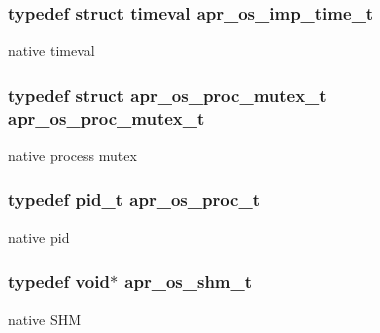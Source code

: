 \subsubsection[{\texorpdfstring{apr\+\_\+os\+\_\+imp\+\_\+time\+\_\+t}{apr_os_imp_time_t}}]{\setlength{\rightskip}{0pt plus 5cm}typedef struct timeval {\bf apr\+\_\+os\+\_\+imp\+\_\+time\+\_\+t}}\hypertarget{group__apr__portabile_ga6d27e476300cd1d3fda24e1ff0e358e1}{}\label{group__apr__portabile_ga6d27e476300cd1d3fda24e1ff0e358e1}
native timeval 
\subsubsection[{\texorpdfstring{apr\+\_\+os\+\_\+proc\+\_\+mutex\+\_\+t}{apr_os_proc_mutex_t}}]{\setlength{\rightskip}{0pt plus 5cm}typedef struct {\bf apr\+\_\+os\+\_\+proc\+\_\+mutex\+\_\+t} {\bf apr\+\_\+os\+\_\+proc\+\_\+mutex\+\_\+t}}\hypertarget{group__apr__portabile_ga107413a26e947456cabfcab99b8a7ade}{}\label{group__apr__portabile_ga107413a26e947456cabfcab99b8a7ade}
native process mutex 
\subsubsection[{\texorpdfstring{apr\+\_\+os\+\_\+proc\+\_\+t}{apr_os_proc_t}}]{\setlength{\rightskip}{0pt plus 5cm}typedef pid\+\_\+t {\bf apr\+\_\+os\+\_\+proc\+\_\+t}}\hypertarget{group__apr__portabile_ga2ce5962de629ee6528081813c6b60e2e}{}\label{group__apr__portabile_ga2ce5962de629ee6528081813c6b60e2e}
native pid 
\subsubsection[{\texorpdfstring{apr\+\_\+os\+\_\+shm\+\_\+t}{apr_os_shm_t}}]{\setlength{\rightskip}{0pt plus 5cm}typedef {\bf void}$\ast$ {\bf apr\+\_\+os\+\_\+shm\+\_\+t}}\hypertarget{group__apr__portabile_ga7af1085d6390fbd08d66482b8c17de51}{}\label{group__apr__portabile_ga7af1085d6390fbd08d66482b8c17de51}
native S\+HM 
